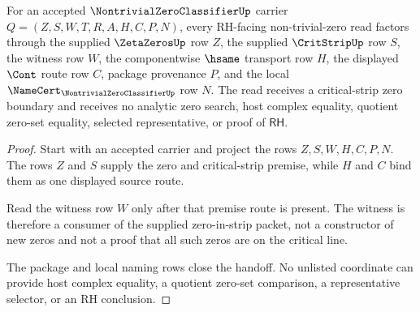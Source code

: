 \begin{theorem}
\label{thm:nontrivial-zero-classifier-critical-strip-handoff}
For an accepted $\NontrivialZeroClassifierUp$ carrier $Q=(Z,S,W,T,R,A,H,C,P,N)$, every RH-facing non-trivial-zero read factors through the supplied $\ZetaZerosUp$ row $Z$, the supplied $\CritStripUp$ row $S$, the witness row $W$, the componentwise $\hsame$ transport row $H$, the displayed $\Cont$ route row $C$, package provenance $P$, and the local $\NameCert_{\NontrivialZeroClassifierUp}$ row $N$. The read receives a critical-strip zero boundary and receives no analytic zero search, host complex equality, quotient zero-set equality, selected representative, or proof of $\mathsf{RH}$.
\end{theorem}
\begin{proof}
Start with an accepted carrier and project the rows $Z,S,W,H,C,P,N$. The rows $Z$ and $S$ supply the zero and critical-strip premise, while $H$ and $C$ bind them as one displayed source route.

Read the witness row $W$ only after that premise route is present. The witness is therefore a consumer of the supplied zero-in-strip packet, not a constructor of new zeros and not a proof that all such zeros are on the critical line.

The package and local naming rows close the handoff. No unlisted coordinate can provide host complex equality, a quotient zero-set comparison, a representative selector, or an RH conclusion.
\end{proof}

